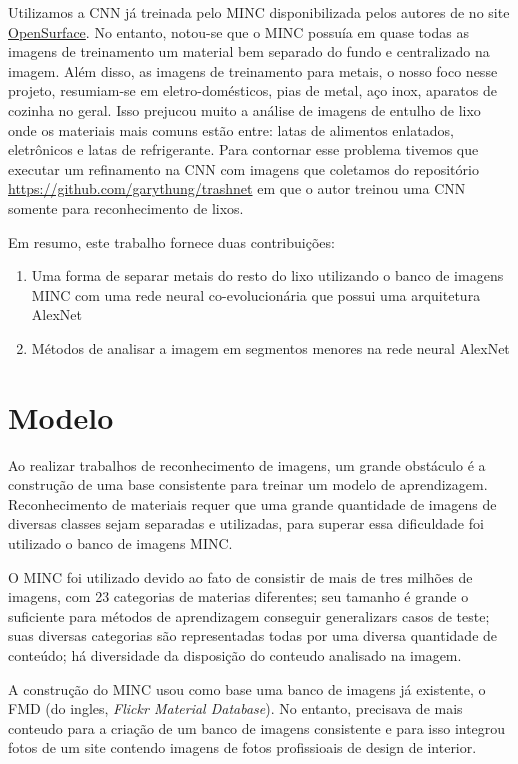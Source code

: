 \documentclass[conference, compsoc, 12pt]{IEEEtran}
\begin{document}
Utilizamos a CNN já treinada pelo MINC disponibilizada pelos autores de \cite{Artigo principal} no site \href{http://opensurfaces.cs.cornell.edu/publications/minc/>}{OpenSurface}. No entanto, notou-se que o MINC possuía em quase todas as imagens de treinamento um material bem separado do fundo e centralizado na imagem. Além disso, as imagens de treinamento para metais, o nosso foco nesse projeto, resumiam-se em eletro-domésticos, pias de metal, aço inox, aparatos de cozinha no geral. Isso prejucou muito a análise de imagens de entulho de lixo onde os materiais mais comuns estão entre: latas de alimentos enlatados, eletrônicos e latas de refrigerante. Para contornar esse problema tivemos que executar um refinamento na CNN com imagens que coletamos do repositório \href{https://github.com/garythung/trashnet}{https://github.com/garythung/trashnet} em que o autor treinou uma CNN somente para reconhecimento de lixos.

Em resumo, este trabalho fornece duas contribuições:

\begin{enumerate}
    \item Uma forma de separar metais do resto do lixo utilizando o banco de imagens MINC com uma rede neural co-evolucionária que possui uma arquitetura AlexNet
    \item Métodos de analisar a imagem em segmentos menores na rede neural AlexNet
\end{enumerate}


\section{Modelo}

Ao realizar trabalhos de reconhecimento de imagens, um grande obstáculo é a construção de uma base consistente para
treinar um modelo de aprendizagem. Reconhecimento de materiais requer que uma grande quantidade de imagens de diversas classes
sejam separadas e utilizadas, para superar essa dificuldade foi utilizado o banco de imagens MINC.

O MINC foi utilizado devido ao fato de consistir de mais de tres milhões de imagens, com 23 categorias de materias diferentes;
seu tamanho é grande o suficiente para métodos de aprendizagem conseguir generalizars casos de teste; suas diversas categorias
são representadas todas por uma diversa quantidade de conteúdo; há diversidade da disposição do conteudo analisado na imagem.

A construção do MINC usou como base uma banco de imagens já existente, o FMD (do ingles, \textit{Flickr Material Database}). No entanto,
precisava de mais conteudo para a criação de um banco de imagens consistente e para isso integrou fotos de um site contendo imagens
de fotos profissioais de design de interior.
\end{document}
